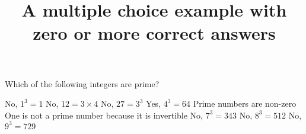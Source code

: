\documentclass{mathquiz}
\title{A multiple choice example with zero or more correct answers}
\begin{document}
  \begin{question}     %
     Which of the following integers are prime?
     \begin{choice}[multiple]
          \response No, $1^3=1$
        \response No, $12 = 3\times 4$
        \response No, $27=3^3$
          \response Yes, $4^3=64$
         \response Prime numbers are non-zero
         \response One is not a prime number because it is invertible
         \response No, $7^3=343$
         \response No, $8^3=512$
         \response No, $9^3=729$
     \end{choice}
  \end{question}
\end{document}
